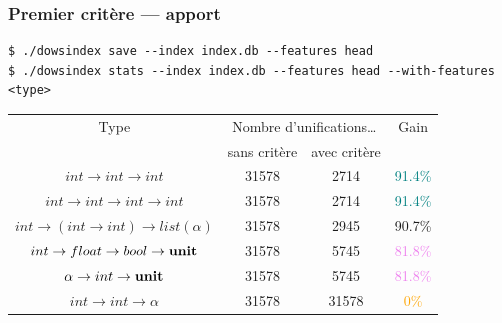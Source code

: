 \documentclass[serif]{beamer}
\begin{document}

\begin{frame}[fragile=singleslide]\frametitle{Premier critère — apport}
\scriptsize
\begin{verbatim}
$ ./dowsindex save --index index.db --features head
$ ./dowsindex stats --index index.db --features head --with-features <type>
\end{verbatim}
\small
\begin{table}[h]
	\centering
	\begin{tabular}{|*{4}{c|}}
		\hline
			Type &
			\multicolumn{2}{c|}{Nombre d'unifications\dots} &
			Gain
		\\
		\cline{2-3}
      		&
			sans critère & avec critère &
		\\
		\hline
			$int \rightarrow int \rightarrow int$ &
			31578 & 2714 & \textcolor{teal}{91.4\%}
		\\
			$int \rightarrow int \rightarrow int \rightarrow int$ &
			31578 & 2714 & \textcolor{teal}{91.4\%}
		\\
			$int \rightarrow (int \rightarrow int) \rightarrow list (\alpha)$ &
			31578 & 2945 & 90.7\%
		\\
			$int \rightarrow float \rightarrow bool \rightarrow \bold{unit}$ &
			31578 & 5745 & \textcolor{violet}{81.8\%}
		\\
			$\alpha \rightarrow int \rightarrow \bold{unit}$ &
			31578 & 5745 & \textcolor{violet}{81.8\%}
		\\
			$int \rightarrow int \rightarrow \alpha$ &
			31578 & 31578 & \textcolor{orange}{0\%}
		\\
		\hline
	\end{tabular}
\end{table}
\end{frame}

\end{document}
